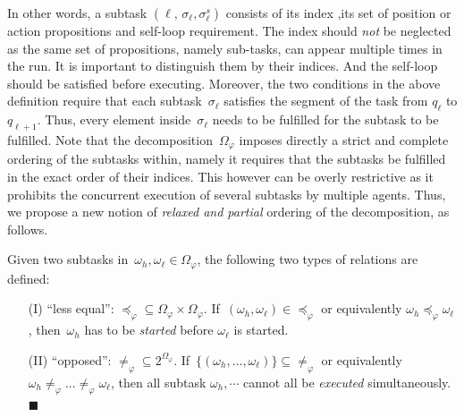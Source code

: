 In other words, a subtask $(\ell,\,\sigma_\ell,\sigma^s_\ell)$ consists of its index
,its set of position or action propositions and self-loop requirement.
The index should \emph{not} be neglected as the same set of propositions, namely sub-tasks,
can appear multiple times in the run.
It is important to distinguish them by their indices. And the self-loop should be satisfied 
before executing.
Moreover, the two conditions in the above definition require that
each subtask~$\sigma_\ell$ satisfies the segment of the task from $q_\ell$ to $q_{\ell+1}$.
Thus, every element inside~$\sigma_\ell$ needs to be fulfilled for the subtask to be fulfilled.
Note that the decomposition~$\Omega_{\varphi}$ imposes directly a {strict and complete} ordering of the subtasks within,
namely it requires that the subtasks be fulfilled in the exact order of their indices.
This however can be overly restrictive as it prohibits the concurrent execution of several subtasks by multiple agents.
Thus, we propose a new notion of \emph{relaxed and partial} ordering of the decomposition,
as follows.

\begin{definition}\label{def:partial}
Given two subtasks in~$\omega_h,
\omega_\ell\in \Omega_{\varphi}$,
the following two types of relations are defined:
\begin{itemize}
\item[(I)] ``less equal'': $\preceq_{\varphi}\subseteq \Omega_{\varphi} \times \Omega_{\varphi}$.
If~$(\omega_h, \omega_\ell)\in \preceq_{\varphi}$ or
equivalently $\omega_h\preceq_{\varphi}\omega_\ell$,
then~$\omega_h$ has to be \emph{started} before $\omega_\ell$ is started.
\item[(II)] ``opposed'': $\neq_{\varphi}\subseteq 2^{\Omega_{\varphi}}$.
If~$\{(\omega_h,\dots,\omega_\ell)\}\subseteq \neq_{\varphi}$
or equivalently $\omega_h\neq_{\varphi}\dots\neq_{\varphi}\omega_\ell$,
then all subtask $\omega_h,\cdots$ cannot all be \emph{executed} simultaneously. 
\hfill $\blacksquare$
\end{itemize}
\end{definition}

